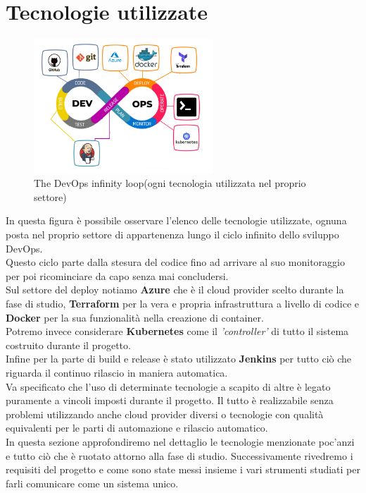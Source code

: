 \documentclass[a4paper,12pt]{report}
\begin{document}
\section{Tecnologie utilizzate}
\begin{figure}[h]
	\centering
	\includegraphics[width=0.6\textwidth]{tech_used}
    \caption{The DevOps infinity loop(ogni tecnologia utilizzata nel proprio settore) \cite{devopsloopimg}}
    \label{fig:tech_used}
\end{figure}
In questa figura è possibile osservare l'elenco delle tecnologie utilizzate, ognuna posta nel proprio settore di appartenenza lungo il ciclo infinito dello sviluppo DevOps.\cite{devopsloop}\\
Questo ciclo parte dalla stesura del codice fino ad arrivare al suo monitoraggio per poi ricominciare da capo senza mai concludersi.\\
Sul settore del deploy notiamo \textbf{Azure} che è il cloud provider scelto durante la fase di studio, \textbf{Terraform} per la vera e propria infrastruttura a livello di codice e \textbf{Docker} per la sua funzionalità nella creazione di container.\\
Potremo invece considerare \textbf{Kubernetes}  come il \textit{'controller'} di tutto il sistema costruito durante il progetto.\\
Infine per la parte di build e release è stato utilizzato \textbf{Jenkins} per tutto ciò che riguarda il continuo rilascio in maniera automatica.\\
Va specificato che l'uso di determinate tecnologie a scapito di altre è legato puramente a vincoli imposti durante il progetto. Il tutto è realizzabile senza problemi utilizzando anche cloud provider diversi o tecnologie con qualità equivalenti per le parti di automazione e rilascio automatico.\\
In questa sezione approfondiremo nel dettaglio le tecnologie menzionate poc'anzi e tutto ciò che è ruotato attorno alla fase di studio. Successivamente rivedremo i requisiti del progetto e come sono state messi insieme i vari strumenti studiati per farli comunicare come un sistema unico.
\end{document}
